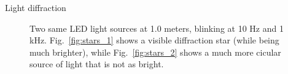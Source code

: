 \documentclass{beamer}
\newcommand{\reffig}[1]{Fig.~\ref{#1}}
\begin{document}
	\begin{frame}{Light diffraction}

		\begin{figure}
			\centering
			\caption{
		  Two same LED light sources at 1.0 meters, blinking at 10 Hz and 1 kHz.
		  \reffig{fig:stars_1} shows a visible diffraction star (while being much brighter), while
		  \reffig{fig:stars_2} shows a
		  much more cicular source of light that is not as bright. \cite{lendermann2018computational}
		  }
			\label{fig:stars}
		\end{figure}
	\end{frame}
\end{document}
